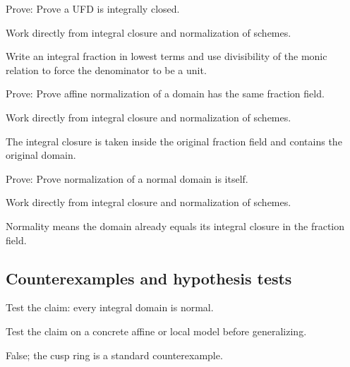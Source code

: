 \begin{exercise}\label{exr:vi28-expand-07}
Prove: Prove a UFD is integrally closed.
\end{exercise}
\begin{hint}
Work directly from integral closure and normalization of schemes.
\end{hint}
\begin{solution}
Write an integral fraction in lowest terms and use divisibility of the monic relation to force the denominator to be a unit.
\end{solution}

\begin{exercise}\label{exr:vi28-expand-08}
Prove: Prove affine normalization of a domain has the same fraction field.
\end{exercise}
\begin{hint}
Work directly from integral closure and normalization of schemes.
\end{hint}
\begin{solution}
The integral closure is taken inside the original fraction field and contains the original domain.
\end{solution}

\begin{exercise}\label{exr:vi28-expand-09}
Prove: Prove normalization of a normal domain is itself.
\end{exercise}
\begin{hint}
Work directly from integral closure and normalization of schemes.
\end{hint}
\begin{solution}
Normality means the domain already equals its integral closure in the fraction field.
\end{solution}

\subsection*{Counterexamples and hypothesis tests}

\begin{exercise}\label{exr:vi28-expand-10}
Test the claim: every integral domain is normal.
\end{exercise}
\begin{hint}
Test the claim on a concrete affine or local model before generalizing.
\end{hint}
\begin{solution}
False; the cusp ring is a standard counterexample.
\end{solution}

